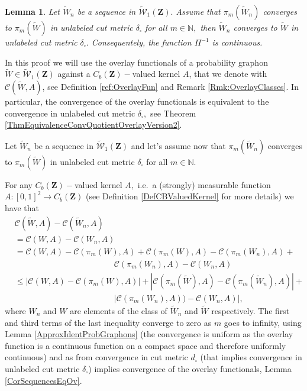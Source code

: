 \documentclass[12pt,twoside,a4paper]{article}
\newtheorem{lemma}[theorem]{Lemma}
\newcommand{\Space}{\mathbf{Z}}
\newcommand{\CbFunct}{C_b(\Space)}
\newcommand{\UGraphon}{\widetilde{\mathcal{W}}_1}
\begin{document}
\begin{lemma}\label{lemm:PiInvCont}
 Let $\widetilde{W}_n$ be a sequence in $\UGraphon(\Space).$ Assume that $\pi_m(\widetilde{W}_n)$ converges to $\pi_m(\widetilde{W})$ in unlabeled cut metric $\delta_{\square}$ for all $m\in \mathbb{N},$ then $\widetilde{W}_n$ converges to $\widetilde{W}$ in unlabeled cut metric $\delta_{\square}.$ Consequentely, the function $\Pi^{-1}$ is continuous. 
\end{lemma}
\proof
In this proof we will use the overlay functionals of a probability graphon $\widetilde{W}\in \UGraphon(\Space)$ against a $\CbFunct-$valued kernel $A$, that we denote with $\mathcal{C}(\widetilde{W},A)$, see Definition \ref{ref:OverlayFun} and Remark \ref{Rmk:OverlayClasses}. In particular, the convergence of the overlay functionals is equivalent to the convergence in unlabeled cut metric $\delta_{\square},$ see Theorem \ref{ThmEquivalenceConvQuotientOverlayVersion2}.

 Let $\widetilde{W}_n$ be a sequence in $\UGraphon(\Space)$ and let's assume now that $\pi_m(\widetilde{W}_n)$ converges to $\pi_m(\widetilde{W})$ in unlabeled cut metric $\delta_{\square}$ for all $m\in \mathbb{N}.$

For any $\CbFunct-$valued kernel $A,$ i.e.\ a (strongly) measurable function $A:[0,1]^2\rightarrow \CbFunct$ (see Definition  \ref{DefCBValuedKernel} for more details) we have that
\begin{equation*}
\begin{aligned}
   & \mathcal{C}(\widetilde{W},A)-  \mathcal{C}(\widetilde{W}_n,A)\\&
    =\mathcal{C}(W,A)-  \mathcal{C}(W_n,A)
    \\&
    =\mathcal{C}(W,A)-\mathcal{C}(\pi_m(W),A)+ \mathcal{C}(\pi_m(W),A) - \mathcal{C}(\pi_m(W_n),A)+ \\
   & \qquad \qquad  \qquad \qquad \qquad  \qquad \mathcal{C}(\pi_m(W_n),A)-  \mathcal{C}(W_n,A)\\
   &
   \leq \left|\mathcal{C}(W,A)-\mathcal{C}(\pi_m(W),A)\right|+ \left|\mathcal{C}(\pi_m(\widetilde{W}),A) - \mathcal{C}(\pi_m(\widetilde{W}_n),A)\right|+ \\
   & \qquad \qquad  \qquad \qquad \qquad  \qquad \left|\mathcal{C}(\pi_m(W_n),A))-  \mathcal{C}(W_n,A)\right|,
\end{aligned}
\end{equation*}
where $W_n$ and $W$ are elements of the class of $\widetilde{W}_n$ and $\widetilde{W}$ respectively.
The first and third terms of the last inequality converge to zero as $m$ goes to infinity, using Lemma \ref{ApproxIdentProbGraphons} (the convergence is uniform as the overlay function is a continuous function on a compact space and therefore uniformly continuous) and as from convergence in cut metric $d_{\square}$ (that implies convergence in unlabeled cut metric $\delta_{\square}$) implies convergence of the overlay functionals, Lemma \ref{CorSequencesEqOv}. 
\end{document}
